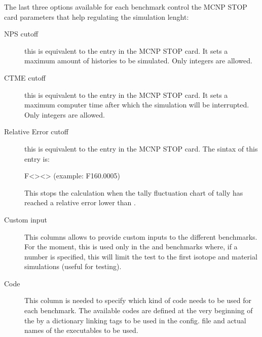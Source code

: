 \documentclass[letterpaper,10pt,english]{sphinxmanual}
\begin{document}
\sphinxAtStartPar
The last three options available for each benchmark control the MCNP STOP card parameters
that help regulating the simulation lenght:
\begin{description}
\item[{NPS cut\sphinxhyphen{}off}] \leavevmode
\sphinxAtStartPar
this is equivalent to the  entry in the MCNP STOP card. It sets a maximum amount
of histories to be simulated. Only integers are allowed.

\item[{CTME cut\sphinxhyphen{}off}] \leavevmode
\sphinxAtStartPar
this is equivalent to the  entry in the MCNP STOP card. It sets a maximum computer
time after which the simulation will be interrupted. Only integers are allowed.

\item[{Relative Error cut\sphinxhyphen{}off}] \leavevmode
\sphinxAtStartPar
this is equivalent to the  entry in the MCNP STOP card. The sintax of this entry is:

\sphinxAtStartPar
F\textless{}\textgreater{}\sphinxhyphen{}\textless{}\textgreater{}  (example: F16\sphinxhyphen{}0.0005)

\sphinxAtStartPar
This stops the calculation when the tally fluctuation chart of tally  has reached a
relative error lower than .

\item[{Custom input}] \leavevmode
\sphinxAtStartPar
{}This columns allows to provide custom inputs to the different benchmarks. For the
moment, this is used only in the  and  benchmarks where,
if a number  is specified, this will limit the test to the first  isotope and
material simulations (useful for testing).

\item[{Code}] \leavevmode
\sphinxAtStartPar
{}This column is needed to specify which kind of code needs to be used for each benchmark.
The available codes are defined at the very beginning of the 
by a dictionary linking tags to be used in the config. file and actual names of the executables
to be used.

\begin{sphinxVerbatim}[commandchars=\\\{\}]
     
\end{sphinxVerbatim}

\end{description}
\end{document}
